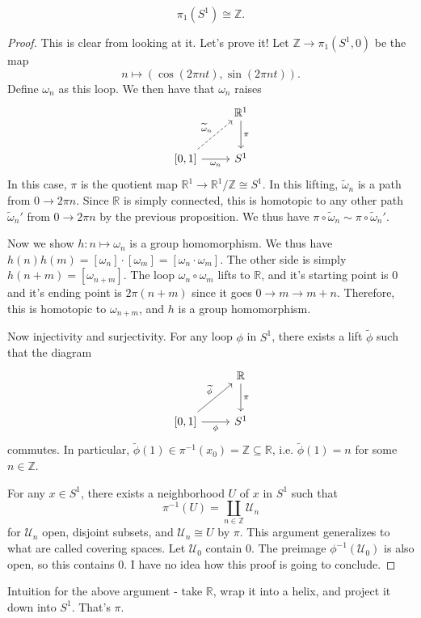 \begin{theorem}\label{thm:kjsd}
	\[
		\pi _1(S^1)\cong \mathbb{Z} 
	.\]
\end{theorem}
\begin{proof}
	This is clear from looking at it. Let's prove it! Let $\mathbb{Z} \to \pi _1(S^1,0)$ be the map
	\[
		n\mapsto (\cos (2\pi nt),\sin (2\pi nt))
	.\]
	Define $\omega _n$ as this loop. We then have that $\omega _n$ raises
	\[\begin{tikzcd}[row sep = 2.5em, column sep = 2.5em]
	 & \mathbb{R} ^1 \ar[" \pi  ", d]  \\
		\left[0,1\right]\ar[ur, dashed, " \widetilde{\omega}_n "] \ar[" \omega _n "', r]  & S^1
	\end{tikzcd}\]
	In this case, $\pi $ is the quotient map $\mathbb{R} ^1\to \mathbb{R} ^1/\mathbb{Z} \cong S^1$. In this lifting, $\widetilde{\omega } _n$ is a path from $0\to 2\pi n$. Since $\mathbb{R} $ is simply connected, this is homotopic to any other path $\widetilde{\omega } _n'$ from $0\to 2\pi n$ by the previous proposition. We thus have $\pi \circ \widetilde{\omega } _n \sim \pi \circ \widetilde{\omega } _n'$.

	Now we show $h:n\mapsto \omega _n$ is a group homomorphism. We thus have $h(n)h(m)=[\omega _n]\cdot [\omega _m]=[\omega _n \cdot \omega _m]$. The other side is simply $h(n+m)=[\omega_{n+m} ]$. The loop $\omega _n \circ \omega _m$ lifts to $\mathbb{R} $, and it's starting point is $0$ and it's ending point is $2\pi (n+m)$ since it goes $0\to m\to m+n$. Therefore, this is homotopic to $\omega_{n+m} $, and $h$ is a group homomorphism.

	Now injectivity and surjectivity. For any loop $\phi $ in $S^1$, there exists a lift $\widetilde{\phi } $ such that the diagram
	\[\begin{tikzcd}[row sep = 2.5em, column sep = 2.5em]
	 & \mathbb{R} \ar[" \pi  ", d]  \\
		\left[ 0,1 \right] \ar[" \widetilde{\phi }  ", ur] \ar[" \phi  "', r]  & S^1
	\end{tikzcd}\]
	commutes. In particular, $\widetilde{\phi } (1)\in \pi ^{-1} (x_0)=\mathbb{Z} \subseteq \mathbb{R} $, i.e. $\widetilde{\phi } (1)=n$ for some $n\in\mathbb{Z} $.

	For any $x\in S^1$, there exists a neighborhood $U$ of $x$ in $S^1$ such that
	\[
		\pi ^{-1} (U)=\coprod_{n\in\mathbb{Z} } \mathcal{U}_n
	\]
	for $\mathcal{U}_n$ open, disjoint subsets, and $\mathcal{U}_n \cong U$ by $\pi $. This argument generalizes to what are called covering spaces. Let $\mathcal{U} _0$ contain $0$. The preimage $\phi ^{-1} (\mathcal{U} _0)$ is also open, so this contains $0$. I have no idea how this proof is going to conclude.
\end{proof}

Intuition for the above argument - take $\mathbb{R} $, wrap it into a helix, and project it down into $S^1$. That's $\pi $.
 
